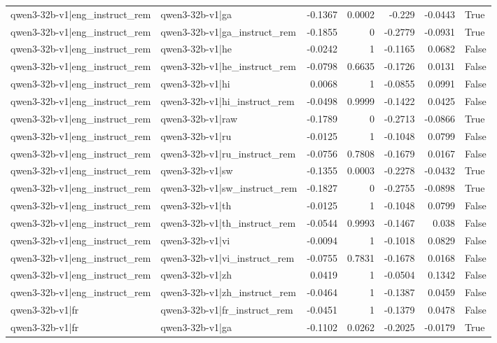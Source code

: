 \begin{table}
\begin{tabular}{l l r r r r l}
qwen3-32b-v1|eng_instruct_rem & qwen3-32b-v1|ga & -0.1367 & 0.0002 & -0.229 & -0.0443 & True \\
qwen3-32b-v1|eng_instruct_rem & qwen3-32b-v1|ga_instruct_rem & -0.1855 & 0 & -0.2779 & -0.0931 & True \\
qwen3-32b-v1|eng_instruct_rem & qwen3-32b-v1|he & -0.0242 & 1 & -0.1165 & 0.0682 & False \\
qwen3-32b-v1|eng_instruct_rem & qwen3-32b-v1|he_instruct_rem & -0.0798 & 0.6635 & -0.1726 & 0.0131 & False \\
qwen3-32b-v1|eng_instruct_rem & qwen3-32b-v1|hi & 0.0068 & 1 & -0.0855 & 0.0991 & False \\
qwen3-32b-v1|eng_instruct_rem & qwen3-32b-v1|hi_instruct_rem & -0.0498 & 0.9999 & -0.1422 & 0.0425 & False \\
qwen3-32b-v1|eng_instruct_rem & qwen3-32b-v1|raw & -0.1789 & 0 & -0.2713 & -0.0866 & True \\
qwen3-32b-v1|eng_instruct_rem & qwen3-32b-v1|ru & -0.0125 & 1 & -0.1048 & 0.0799 & False \\
qwen3-32b-v1|eng_instruct_rem & qwen3-32b-v1|ru_instruct_rem & -0.0756 & 0.7808 & -0.1679 & 0.0167 & False \\
qwen3-32b-v1|eng_instruct_rem & qwen3-32b-v1|sw & -0.1355 & 0.0003 & -0.2278 & -0.0432 & True \\
qwen3-32b-v1|eng_instruct_rem & qwen3-32b-v1|sw_instruct_rem & -0.1827 & 0 & -0.2755 & -0.0898 & True \\
qwen3-32b-v1|eng_instruct_rem & qwen3-32b-v1|th & -0.0125 & 1 & -0.1048 & 0.0799 & False \\
qwen3-32b-v1|eng_instruct_rem & qwen3-32b-v1|th_instruct_rem & -0.0544 & 0.9993 & -0.1467 & 0.038 & False \\
qwen3-32b-v1|eng_instruct_rem & qwen3-32b-v1|vi & -0.0094 & 1 & -0.1018 & 0.0829 & False \\
qwen3-32b-v1|eng_instruct_rem & qwen3-32b-v1|vi_instruct_rem & -0.0755 & 0.7831 & -0.1678 & 0.0168 & False \\
qwen3-32b-v1|eng_instruct_rem & qwen3-32b-v1|zh & 0.0419 & 1 & -0.0504 & 0.1342 & False \\
qwen3-32b-v1|eng_instruct_rem & qwen3-32b-v1|zh_instruct_rem & -0.0464 & 1 & -0.1387 & 0.0459 & False \\
qwen3-32b-v1|fr & qwen3-32b-v1|fr_instruct_rem & -0.0451 & 1 & -0.1379 & 0.0478 & False \\
qwen3-32b-v1|fr & qwen3-32b-v1|ga & -0.1102 & 0.0262 & -0.2025 & -0.0179 & True \\

\end{tabular}
\end{table}

